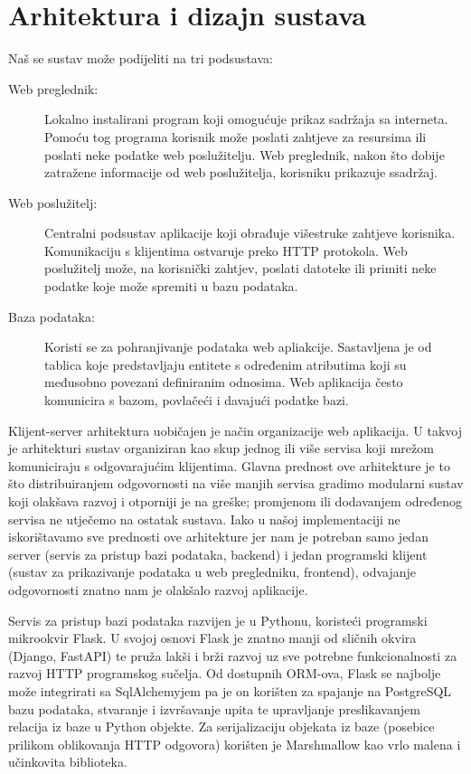 \chapter{Arhitektura i dizajn sustava}

\noindent
Naš se sustav može podijeliti na tri podsustava:
\begin{description}
	\item[Web preglednik:] Lokalno instalirani program koji omogućuje prikaz sadržaja sa interneta. 
	Pomoću tog programa korisnik može poslati zahtjeve za 
	resursima ili poslati neke podatke web poslužitelju. Web preglednik, 
	nakon što dobije zatražene informacije od web poslužitelja, korisniku prikazuje ssadržaj.

	\item[Web poslužitelj:] Centralni podsustav aplikacije koji obrađuje višestruke zahtjeve korisnika. Komunikaciju s klijentima ostvaruje preko
	HTTP protokola. Web poslužitelj može, na korisnički zahtjev, poslati datoteke ili primiti
	neke podatke koje može spremiti u bazu podataka.

	\item[Baza podataka:] Koristi se za pohranjivanje podataka web apliakcije. Sastavljena je od tablica koje
	predstavljaju entitete s određenim atributima koji su međusobno povezani definiranim
	odnosima. Web aplikacija često komunicira s bazom, povlačeći i davajući podatke bazi.
\end{description}

Klijent-server arhitektura uobičajen je način organizacije web aplikacija. U takvoj je arhitekturi sustav organiziran kao skup jednog ili više servisa koji mrežom komuniciraju s odgovarajućim klijentima. Glavna prednost ove arhitekture je to što distribuiranjem odgovornosti na više manjih servisa gradimo modularni sustav koji olakšava razvoj i otporniji je na greške; promjenom ili dodavanjem određenog servisa ne utječemo na ostatak sustava. Iako u našoj implementaciji ne iskorištavamo sve prednosti ove arhitekture jer nam je potreban samo jedan server (servis za pristup bazi podataka, backend) i jedan programski klijent (sustav za prikazivanje podataka u web pregledniku, frontend), odvajanje odgovornosti znatno nam je olakšalo razvoj aplikacije.

Servis za pristup bazi podataka razvijen je u Pythonu, koristeći programski mikrookvir Flask. U svojoj osnovi Flask je znatno manji od sličnih okvira (Django, FastAPI) te pruža lakši i brži razvoj uz sve potrebne funkcionalnosti za razvoj HTTP programskog sučelja. Od dostupnih ORM-ova, Flask se najbolje može integrirati sa SqlAlchemyjem pa je on korišten za spajanje na PostgreSQL bazu podataka, stvaranje i izvršavanje upita te upravljanje preslikavanjem relacija iz baze u Python objekte. Za serijalizaciju objekata iz baze (posebice prilikom oblikovanja HTTP odgovora) korišten je Marshmallow kao vrlo malena i učinkovita biblioteka.

